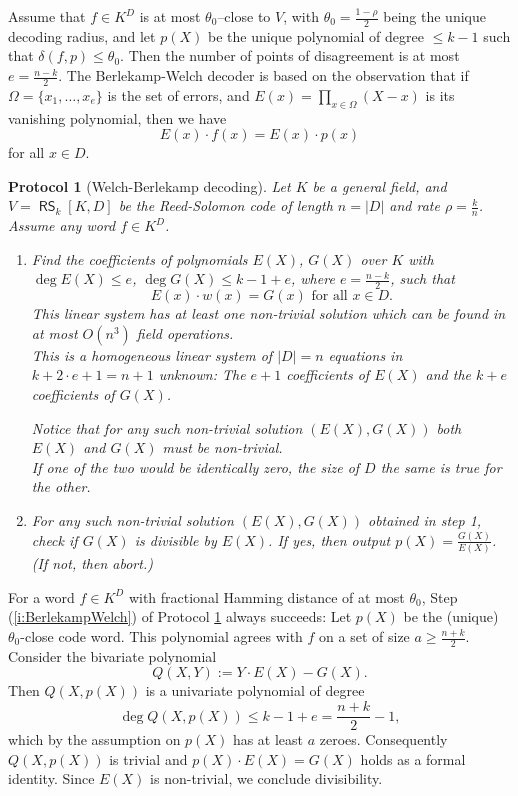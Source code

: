 \documentclass[11pt,article,oneside]{memoir}
\newtheorem{protocol}[]{Protocol}
\theoremstyle{definition}
\theoremstyle{remark}
\DeclareMathOperator{\RS}{\mathsf{RS}}
\begin{document}
Assume that  $f\in K^D$ is at most $\theta_0$--close to $V$, with
$\theta_0 = \frac{1-\rho}{2}$ being the unique decoding radius, 
and let $p(X)$ be the unique polynomial of degree $\leq k-1$ such that $\delta(f,p) \leq \theta_0$. 
Then the number of points of disagreement is at most $e=\frac{n-k}{2}$. 
The Berlekamp-Welch decoder \cite{BerlekampWelch} is based on the observation that if $\Omega =\{x_1,\ldots,x_e\}$ is the set of errors, and $E(x)=\prod_{x\in\Omega} (X-x)$ is its vanishing polynomial, then we have 
\[
E(x)\cdot f(x) = E(x)\cdot p(x)
\]
for all $x\in D$.

\begin{protocol}[Welch-Berlekamp decoding]
\label{p:BerlekampWelch} 
Let $K$ be a general field, and $V=\RS_k[K,D]$ be the Reed-Solomon code  of length $n= |D|$ and rate $\rho = \frac{k}{n}$.  
Assume any word $f\in K^D$. 
\begin{enumerate}
\item 
Find the coefficients of polynomials $E(X)$, $G(X)$ over $K$ with $\deg E(X)\leq e$, $\deg G(X)\leq k-1+e$, where $e=\frac{n-k}{2}$, such that
\[
	E(x)\cdot w(x) = G(x) \text{ for all } x\in D.
\] 
This linear system has at least one non-trivial solution which can be found in at most $O\left(n^3\right)$ field operations.
\\
{\tiny
This is a homogeneous linear system of $|D|=n$ equations in $k+2\cdot e+1=n+1$ unknown: 
The $e+1$ coefficients of $E(X)$ and the $k+e$ coefficients of $G(X)$.
}

Notice that for any such non-trivial solution $(E(X),G(X))$ both $E(X)$ and $G(X)$ must be non-trivial. 
\\
{\tiny
If one of the two would be identically zero, the size of $D$ the same is true for the other.
}

\item
\label{i:BerlekampWelch}
For any such non-trivial solution $(E(X),G(X))$ obtained in step 1, check if $G(X)$ is divisible by $E(X)$. 
If yes, then output $p(X)= \frac{G(X)}{E(X)}$.  
(If not, then abort.)
\end{enumerate}
\end{protocol}

For a word $f\in K^D$ with fractional Hamming distance of at most $\theta_0$, Step (\ref{i:BerlekampWelch}) of Protocol \ref{p:BerlekampWelch} always succeeds: 
Let $p(X)$ be the (unique) $\theta_0$-close code word. 
This polynomial agrees with $f$ on a set of size $a\geq\frac{n+k}{2}$. 
Consider the bivariate polynomial
\[
Q(X,Y):= Y\cdot E(X)-G(X). 
\]
Then $Q(X,p(X))$ is a univariate polynomial of degree 
\[
\deg Q(X,p(X)) \leq k-1+e =\frac{n+k}{2} - 1,
\] 
which by the assumption on $p(X)$ has at least $a$ zeroes. 
Consequently $Q(X,p(X))$ is trivial and $p(X)\cdot E(X)=G(X)$ holds as a formal identity. 
Since $E(X)$ is non-trivial, we conclude divisibility. 
\end{document}
